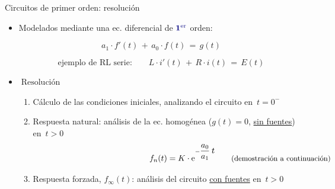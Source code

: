\documentclass[aspectratio=169, usenames,svgnames,dvipsnames]{beamer}
\begin{document}

\begin{frame}{Circuitos de primer orden: \hspace{3mm}resolución} \label{diapo:pasos_PrimerOrden}
    \vspace{2mm}
    \begin{itemize}
        \item Modelados mediante una \alert{ec. diferencial de} ${\boldsymbol{\color{blue!50!black} 1^{\textrm{er}}}}$ \alert{orden}:   

        \vspace{1mm}
        \begin{equation*}
           \boxed{\; a_1\cdot f'(t) \,+\, a_0\cdot f(t) \,=\, g(t) \;}
        \end{equation*}
        
        \begin{equation*}
            \textrm{ejemplo de RL serie:} \qquad L\cdot i'(t) \,+\, R\cdot i(t) \,=\, E(t)
        \end{equation*}

        \vspace{1mm}
        \item $\boxed{\; \textrm{Resolución} \;}$

        \vspace{2mm}
        \begin{enumerate}
            \normalsize
            \item Cálculo de las \alert{condiciones iniciales}, analizando el circuito en \(\,t=0^-\)

            \vspace{2mm}
            \item \alert{Respuesta natural}: análisis de la \alert{ec. homogénea} ($g(t)=0$, \underline{sin fuentes}) en \(\, t>0\)
            \begin{equation*}
                \hspace*{50mm} f_n(t) = K\cdot\mathrm{e}^{-\dfrac{a_0}{a_1}\, \scalebox{2} {\tiny \textit{t}}} \qquad \textrm{\small(demostración a continuación)}
            \end{equation*}

            \normalsize
            \vspace{2mm}
            \item \alert{Respuesta forzada}, $f_\infty(t)$: análisis del circuito \underline{con fuentes} en \(\, t>0\)
        \end{enumerate}
    \end{itemize}
\end{frame}
\end{document}
